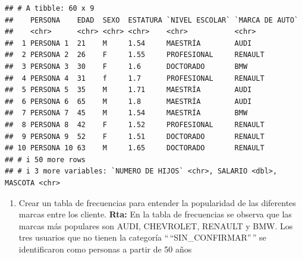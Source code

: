 \documentclass[
]{article}
\newenvironment{Shaded}{\begin{snugshade}}{\end{snugshade}}
\newcommand{\AttributeTok}[1]{\textcolor[rgb]{0.13,0.29,0.53}{#1}}
\newcommand{\CommentTok}[1]{\textcolor[rgb]{0.56,0.35,0.01}{\textit{#1}}}
\newcommand{\FunctionTok}[1]{\textcolor[rgb]{0.13,0.29,0.53}{\textbf{#1}}}
\newcommand{\NormalTok}[1]{#1}
\newcommand{\OtherTok}[1]{\textcolor[rgb]{0.56,0.35,0.01}{#1}}
\newcommand{\SpecialCharTok}[1]{\textcolor[rgb]{0.81,0.36,0.00}{\textbf{#1}}}
\newcommand{\StringTok}[1]{\textcolor[rgb]{0.31,0.60,0.02}{#1}}
\providecommand{\tightlist}{%
  \setlength{\itemsep}{0pt}\setlength{\parskip}{0pt}}
\begin{document}
\begin{verbatim}
## # A tibble: 60 x 9
##    PERSONA    EDAD  SEXO  ESTATURA `NIVEL ESCOLAR` `MARCA DE AUTO`
##    <chr>      <chr> <chr> <chr>    <chr>           <chr>          
##  1 PERSONA 1  21    M     1.54     MAESTRÍA        AUDI           
##  2 PERSONA 2  26    F     1.55     PROFESIONAL     RENAULT        
##  3 PERSONA 3  30    F     1.6      DOCTORADO       BMW            
##  4 PERSONA 4  31    f     1.7      PROFESIONAL     RENAULT        
##  5 PERSONA 5  35    M     1.71     MAESTRÍA        AUDI           
##  6 PERSONA 6  65    M     1.8      MAESTRÍA        AUDI           
##  7 PERSONA 7  45    M     1.54     MAESTRÍA        BMW            
##  8 PERSONA 8  42    F     1.52     PROFESIONAL     RENAULT        
##  9 PERSONA 9  52    F     1.51     DOCTORADO       RENAULT        
## 10 PERSONA 10 63    M     1.65     DOCTORADO       RENAULT        
## # i 50 more rows
## # i 3 more variables: `NUMERO DE HIJOS` <chr>, SALARIO <dbl>, MASCOTA <chr>
\end{verbatim}

\begin{enumerate}
\def\labelenumi{\alph{enumi}.}
\setcounter{enumi}{1}
\tightlist
\item
  Crear un tabla de frecuencias para entender la popularidad de las
  diferentes marcas entre los cliente. \textbf{Rta:} En la tabla de
  frecuencias se observa que las marcas más populares son AUDI,
  CHEVROLET, RENAULT y BMW. Los tres usuarios que no tienen la categoría
  ``\,``SIN\_CONFIRMAR''\,'' se identificaron como personas a partir de
  50 años
\end{enumerate}

\begin{Shaded}
\end{Shaded}
\end{document}
